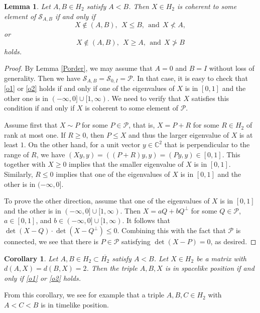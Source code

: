 \documentclass[10pt,a4paper]{amsart}
\newcommand\cP{{\mathcal{P}}}
\newcommand\oH{{\overline{H_2}}}
\newtheorem{lemma}[theorem]{Lemma}
\newtheorem{corollary}[theorem]{Corollary}
\theoremstyle{definition}
\theoremstyle{remark}
\numberwithin{subsection}{section}
\numberwithin{equation}{section}
\begin{document}
\begin{lemma}\label{c(s)}
Let $A, B\in H_2$ satisfy $A<B$. 
Then $X\in H_2$ is coherent to some element of $\mathcal{S}_{A, B}$ if and only if 
\begin{equation}\label{o1}
X\notin (A, B),\ \  X\leq B,\ \ \text{and} \ \ X\not< A,
\end{equation}
or
\begin{equation}\label{o2}
X\notin (A, B),\ \ X\geq A,\ \ \text{and}\ \ X\not> B 
\end{equation}
holds.
\end{lemma}
\begin{proof}
By Lemma \ref{Porder}, we may assume that $A=0$ and $B=I$ without loss of generality.
Then we have $\mathcal{S}_{A, B}=\mathcal{S}_{0, I}=\mathcal{P}$. 
In that case, it is easy to check that \eqref{o1} or \eqref{o2} holds if and only if one of the eigenvalues of $X$ is in $[0,1]$ and the other one is in $(-\infty, 0]\cup [1, \infty)$.
We need to verify that $X$ satisfies this condition if and only if $X$ is coherent to some element of $\mathcal{P}$.

Assume first that $X \sim P$ for some $P \in \mathcal{P}$, that is, $X = P +R$ for some $R \in H_2$ of rank at most one. 
If $R\geq 0$, then $P\leq X$ and thus the larger eigenvalue of $X$ is at least $1$. 
On the other hand, for a unit vector $y\in \mathbb{C}^2$ that is perpendicular to the range of $R$, we have $(Xy,y)=( (P+R) y,y) = (Py,y) \in [0,1]$.
This together with $X\geq 0$ implies that the smaller eigenvalue of $X$ is in $[0,1]$. 
Similarly, $R\leq 0$ implies that one of the eigenvalues of $X$ is in $[0,1]$ and the other is in $(-\infty, 0]$. 

To prove the other direction, assume that one of the eigenvalues of $X$ is in $[0,1]$ and the other is in $(-\infty, 0]\cup [1, \infty)$. 
Then $X=aQ+bQ^\perp$ for some $Q\in \cP$, $a\in [0,1]$, and $b\in (-\infty, 0]\cup [1, \infty)$.
It follows that $\det(X-Q)\cdot \det(X-Q^\perp)\leq 0$. 
Combining this with the fact that $\cP$ is connected, we see that there is $P\in \cP$ satisfying $\det(X-P)=0$, as desired.
\end{proof}





\begin{corollary}\label{matrixtriple}
Let $A, B\in H_2\subset \oH$ satisfy $A<B$. 
Let $X\in H_2$ be a matrix with $d(A, X)=d(B,X)=2$. 
Then the triple $A, B, X$ is in spacelike position if and only if \eqref{o1} or \eqref{o2} holds.
\end{corollary}
From this corollary, we see for example that a triple $A,B, C\in H_2$ with $A<C<B$ is in timelike position.
\end{document}
